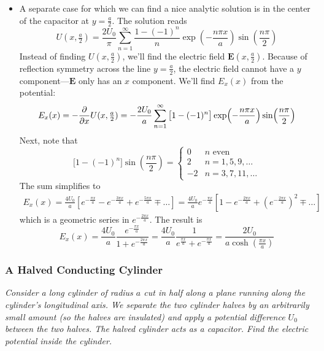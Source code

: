 \documentclass[11pt, a4paper]{article}
\renewcommand{\vec}[1]{\bm{#1}} %
\newcommand{\E}{\vec{E}} %
\begin{document}
\begin{itemize}
	\item A separate case for which we can find a nice analytic solution is in the center of the capacitor at $ y = \frac{a}{2} $. The solution reads
	\begin{equation*}
		U(x, \tfrac{a}{2}) = \frac{2U_{0}}{\pi} \sum_{n = 1}^{\infty}\frac{1 - (-1)^{n}}{n}\exp(-\frac{n\pi x}{a}) \sin(\frac{n\pi}{2})
	\end{equation*}
	Instead of finding $ U(x, \tfrac{a}{2}) $, we'll find the electric field $ \E(x, \tfrac{a}{2}) $. Because of reflection symmetry across the line $ y = \frac{a}{2} $, the electric field cannot have a $ y $ component---$ \E $ only has an $ x $ component. We'll find $ E_{x}(x) $ from the potential:
	\begin{equation*}
		E_{x}(x) = -\pdv{}{x}U(x, \tfrac{a}{2}) = -\frac{2U_{0}}{a} \sum_{n = 1}^{\infty}\big[1 - (-1)^{n}\big]\exp(-\frac{n\pi x}{a}) \sin(\frac{n\pi}{2})
	\end{equation*}
	Next, note that
	\begin{equation*}
		\big[1 - (-1)^{n}\big]\sin(\frac{n\pi}{2}) = 
		\begin{cases}
			0 & n \text{ even}\\
			2 & n = 1, 5, 9, \ldots\\
			- 2 & n = 3, 7, 11, \ldots
		\end{cases}
	\end{equation*}
	The sum simplifies to
	\begin{align*}
		E_{x}(x) = \frac{4U_{0}}{a}\left[e^{-\frac{\pi x}{a}} - e^{-\frac{3\pi x}{a}} + e^{-\frac{5\pi x}{a}} \mp \ldots \right] = \frac{4U_{0}}{a}e^{-\frac{\pi x}{a}}\left[1 - e^{-\frac{2\pi x}{a}} + \left(e^{-\frac{2\pi x}{a}}\right)^{2}\mp \ldots \right]
	\end{align*}
	which is a geometric series in $ e^{-\frac{2\pi x}{a}} $. The result is
	\begin{equation*}
		E_{x}(x) =  \frac{4U_{0}}{a}\frac{e^{-\frac{\pi x}{a}}}{1 + e^{-\frac{2\pi x}{a}}} = \frac{4U_{0}}{a}\frac{1}{e^{\frac{\pi x}{a}} + e^{-\frac{\pi x}{a}}} = \frac{2U_{0}}{a\cosh(\frac{\pi x}{a})}
	\end{equation*}
\end{itemize}

\subsubsection{A Halved Conducting Cylinder}
\textit{Consider a long cylinder of radius $ a $ cut in half along a plane running along the cylinder's longitudinal axis. We separate the two cylinder halves by an arbitrarily small amount (so the halves are insulated) and apply a potential difference $ U_{0} $ between the two halves. The halved cylinder acts as a capacitor. Find the electric potential inside the cylinder.}
\end{document}
